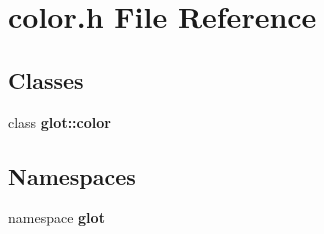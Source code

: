 \section{color.h File Reference}
\label{color_8h}
\subsection*{Classes}
\begin{CompactItemize}
\item 
class {\bf glot::color}
\end{CompactItemize}
\subsection*{Namespaces}
\begin{CompactItemize}
\item 
namespace {\bf glot}
\end{CompactItemize}
